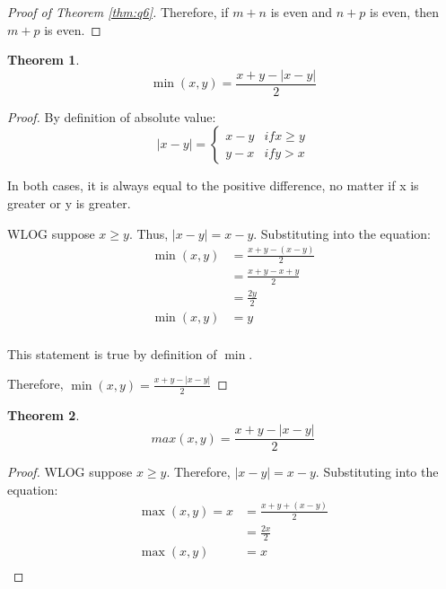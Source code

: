 \documentclass{article}
\newtheorem{theorem}{Theorem}
\numberwithin{subcase}{case}
\begin{document}
\begin{outline}[enumerate]
\begin{proof}[Proof of Theorem \ref{thm:q6}]
            Therefore, if $m + n$ is even and $n + p$ is even, then $m + p$ is even.
        \end{proof}

    \1 \begin{theorem}
        \begin{equation}
            \min(x, y) = \frac{x + y - | x - y |}{2}
        \end{equation}
    \end{theorem}

    \begin{proof}
        By definition of absolute value:
        \begin{equation}
            |x - y| = \begin{cases}
                x - y &if x \geq y \\
                y - x &if y > x
            \end{cases}
        \end{equation}

        In both cases, it is always equal to the positive difference, no matter if x is greater or y is greater.

        WLOG suppose $x \geq y$. Thus, $|x - y| = x - y$. Substituting into the equation:
        \begin{equation}
            \begin{aligned}
                \min(x, y) &= \frac{x + y - (x - y)}{2} \\
                &= \frac{x + y - x + y}{2} \\
                &= \frac{2y}{2} \\
                \min(x, y) &= y \\
            \end{aligned}
        \end{equation}

        This statement is true by definition of $\min$. 
        
        Therefore, $\min(x, y) = \frac{x + y - | x - y |}{2}$
    \end{proof}

    \1 \begin{theorem}
        \begin{equation}
            max(x, y) = \frac{x + y - | x - y |}{2}
        \end{equation}
    \end{theorem}

    \begin{proof}
        WLOG suppose $x \geq y$. Therefore, $|x - y| = x - y$. Substituting into the equation:
        \begin{equation}
            \begin{aligned}
                \max(x, y) = x &= \frac{x + y + (x - y)}{2} \\
                &= \frac{2x}{2} \\
                \max(x, y) &= x \\
            \end{aligned}
        \end{equation}


\end{proof}
\end{outline}
\end{document}
